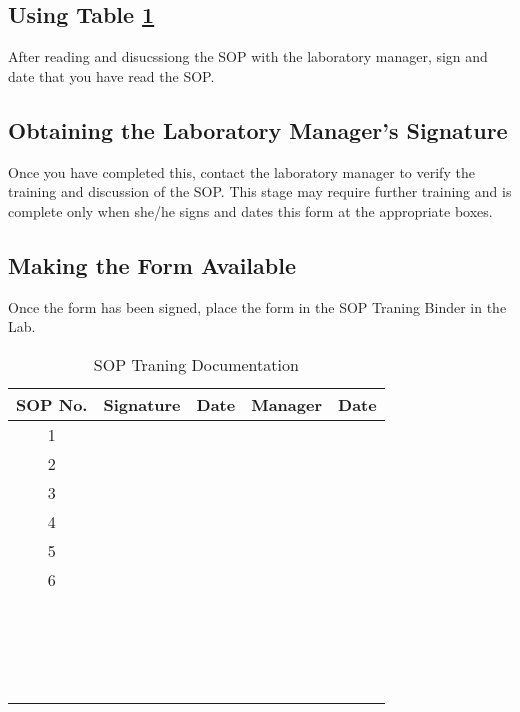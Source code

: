 \documentclass{article}
\begin{document}
\subsection{Using Table \ref{tab:Documentation}}

After reading and disucssiong the SOP with the laboratory manager, sign and date that you have read the SOP. 

\subsection{Obtaining the Laboratory Manager's Signature}
Once you have completed this, contact the laboratory manager to verify the training and discussion of the SOP. This stage may require further training and is complete only when she/he signs and dates this form at the appropriate boxes. 

\subsection{Making the Form Available}

Once the form has been signed, place the form in the SOP Traning Binder in the Lab. 


\begin{table}[h]
	\caption{SOP Traning Documentation}
	\label{tab:Documentation}
		\begin{tabular}{|c|p{4cm}|p{2cm}|p{4cm}|p{2cm}|}\hline
SOP No. & Signature & Date  & Manager & Date \\
\hline
1  & & & & \\ [1.2ex]\hline
2  & & & & \\ [1.2ex]\hline
3  & & & & \\ [1.2ex]\hline
4  & & & & \\ [1.2ex]\hline
5  & & & & \\ [1.2ex]\hline
6  & & & & \\ [1.2ex]\hline
  & & & & \\ [1.2ex]\hline
  & & & & \\ [1.2ex]\hline
  & & & & \\ [1.2ex]\hline
  & & & & \\ [1.2ex]\hline
  & & & & \\ [1.2ex]\hline
  & & & & \\ [1.2ex]\hline
  & & & & \\ [1.2ex]\hline
  & & & & \\ [1.2ex]\hline
  & & & & \\ [1.2ex]\hline
  & & & & \\ [1.2ex]\hline
  & & & & \\ [1.2ex]\hline
  & & & & \\ [1.2ex]\hline
  & & & & \\ [1.2ex]\hline
  & & & & \\ [1.2ex]\hline
  & & & & \\ [1.2ex]\hline
  & & & & \\ [1.2ex]\hline
  & & & & \\ [1.2ex]\hline
  & & & & \\ [1.2ex]\hline
		\end{tabular}

\end{table}
\end{document}
